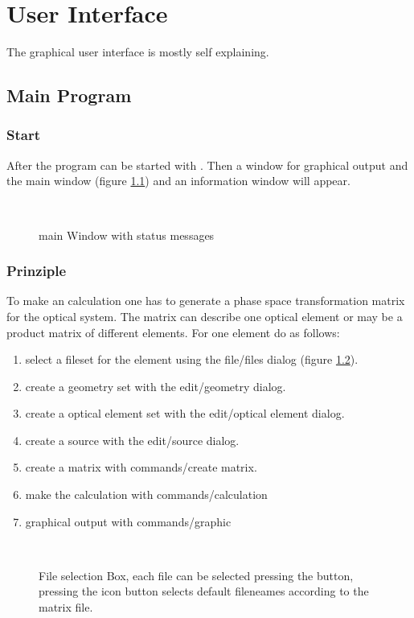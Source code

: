 
\chapter{User Interface}
The graphical user interface is mostly self explaining. 
\section {Main Program}
\subsection{Start}
After  the program can be started with . Then a
window for graphical output and the main window (figure \ref{mw}) and an
information window will appear.
\begin{figure}
\centerline{ \hbox{
 }}  
  \caption {\label{mw} \phase main Window with status messages} 
\end {figure}     

\subsection {Prinziple}
To make an calculation one has to generate a phase space transformation matrix
for the optical system. The matrix can describe one optical element or may be a
product matrix of different elements.
For one element do as follows:  
\begin{enumerate} 
\item select a fileset for the element using the file/files dialog (figure 
\ref{fseldia}).
\item create a geometry set with the edit/geometry dialog.
\item create a optical element set with the edit/optical element dialog.    
\item create a source with the edit/source dialog.    
\item create a matrix with commands/create matrix.
\item make the calculation with commands/calculation
\item graphical output with commands/graphic
\end {enumerate}

\begin{figure}
\centerline{ \hbox{
 }}  
  \caption {\label{fseldia} File selection Box, each file can be selected
pressing the button, pressing the icon button selects default fileneames
according to the matrix file.} 
\end {figure}  
   
